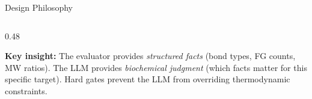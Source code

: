 \documentclass[aspectratio=169, 11pt]{beamer}
\begin{document}
\begin{frame}{Design Philosophy}
\begin{columns}[T]
\begin{column}{0.48\textwidth}
\vspace{2pt}
\begin{center}
\colorbox{lightblue!50}{\parbox{0.92\textwidth}{\centering
\scriptsize\textbf{Key insight:} The evaluator provides \textit{structured facts} (bond types, FG counts, MW ratios). The LLM provides \textit{biochemical judgment} (which facts matter for this specific target). Hard gates prevent the LLM from overriding thermodynamic constraints.
}}
\end{center}

\end{column}
\end{columns}
\end{frame}

\end{document}
